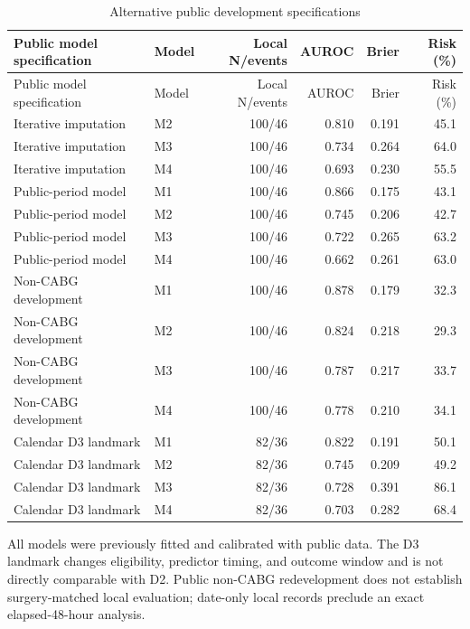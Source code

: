 \documentclass[pdflatex,sn-vancouver-num]{sn-jnl}
\begin{document}
\begin{longtable}{p{3.6cm}lrrrr}
\caption{Alternative public development specifications}\label{tab:s9}\\
\toprule
Public model specification & Model & Local N/events & AUROC & Brier & Risk (\%)\\\midrule
\endfirsthead
\toprule
Public model specification & Model & Local N/events & AUROC & Brier & Risk (\%)\\\midrule
\endhead
\endfoot
\bottomrule\endlastfoot
Iterative imputation & M2 & 100/46 & 0.810 & 0.191 & 45.1\\
Iterative imputation & M3 & 100/46 & 0.734 & 0.264 & 64.0\\
Iterative imputation & M4 & 100/46 & 0.693 & 0.230 & 55.5\\
Public-period model & M1 & 100/46 & 0.866 & 0.175 & 43.1\\
Public-period model & M2 & 100/46 & 0.745 & 0.206 & 42.7\\
Public-period model & M3 & 100/46 & 0.722 & 0.265 & 63.2\\
Public-period model & M4 & 100/46 & 0.662 & 0.261 & 63.0\\
Non-CABG development & M1 & 100/46 & 0.878 & 0.179 & 32.3\\
Non-CABG development & M2 & 100/46 & 0.824 & 0.218 & 29.3\\
Non-CABG development & M3 & 100/46 & 0.787 & 0.217 & 33.7\\
Non-CABG development & M4 & 100/46 & 0.778 & 0.210 & 34.1\\
Calendar D3 landmark & M1 & 82/36 & 0.822 & 0.191 & 50.1\\
Calendar D3 landmark & M2 & 82/36 & 0.745 & 0.209 & 49.2\\
Calendar D3 landmark & M3 & 82/36 & 0.728 & 0.391 & 86.1\\
Calendar D3 landmark & M4 & 82/36 & 0.703 & 0.282 & 68.4\\
\end{longtable}
\noindent All models were previously fitted and calibrated with public data. The D3 landmark changes eligibility, predictor timing, and outcome window and is not directly comparable with D2. Public non-CABG redevelopment does not establish surgery-matched local evaluation; date-only local records preclude an exact elapsed-48-hour analysis.\par\endgroup
\begingroup\scriptsize\setlength{\tabcolsep}{2pt}
\end{document}
